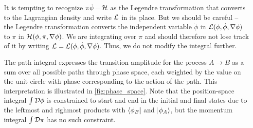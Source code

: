 It is tempting to recognize $\pi \dot\phi - \mathcal{H}$ as the Legendre transformation that converts to the Lagrangian density and write $\lagr$ in its place.
But we should be careful -- the Legendre transformation converts the independent variable $\dot\phi$ in $\mathcal{L}(\phi, \dot\phi, \nabla\phi)$ to $\pi$ in $\mathcal{H}(\phi, \pi, \nabla\phi)$.
We are integrating over $\pi$ and should therefore not lose track of it by writing $\mathcal{L} = \mathcal{L}(\phi, \dot\phi, \nabla\phi)$.
Thus, we do not modify the integral further.

\iffalse
Note that the combination of the Hamiltonian and the fields in the exponential is precisely the Legendre transformation that converts between the Hamiltonian density $\ham$ and the Lagrangian density $\lagr$.
Thus, we might as well express the transition amplitude as the \textbf{path integral}
\begin{equation}
	\transampl = \int \pathintdif \pi \int_{\phi_A(\vec{x})}^{\phi_B(\vec{x})} \pathintdif \phi \, \exp \big( i S \left[ \pi(\vec{x}, t), \phi(\vec{x}, t) \right] / \hbar \big) ,
\label{eq:tft:path_integral_lagrangian}
\end{equation}
with the action
\begin{equation}
	S \left[ \pi(\vec{x}, t), \phi(\vec{x}, t) \right] = \int_0^T \dif t \int \dif^3 x \, \lagr \left( \pi(\vec{x}, t), \phi(\vec{x}, t) \right) . \qquad \text{TODO: factor $c$?}
\label{eq:tft:action}
\end{equation}
\fi
The path integral expresses the transition amplitude for the process $A \rightarrow B$ as a sum over all possible paths through phase space, each weighted by the value on the unit circle with phase corresponding to the action of the path.
This interpretation is illustrated in \cref{fig:phase_space}.
Note that the position-space integral $\int \mathcal{D} \phi$ is constrained to start and end in the initial and final states due to the leftmost and righmost products with $\bra{\phi_B}$ and $\ket{\phi_A}$, but the momentum integral $\int \mathcal{D} \pi$ has no such constraint.

